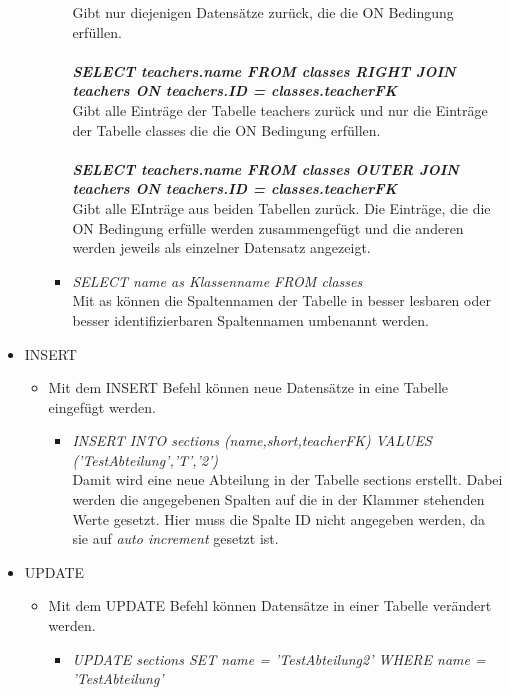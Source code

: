\begin{itemize}
\begin{itemize}
\begin{itemize}
		    			Gibt nur diejenigen Datensätze zurück, die die ON Bedingung erfüllen.\\\\
		    		\textbf{\textit{SELECT teachers.name FROM classes RIGHT JOIN teachers ON teachers.ID = classes.teacherFK}}\\
		    			Gibt alle Einträge der Tabelle teachers zurück und nur die Einträge der Tabelle classes die die ON Bedingung erfüllen.\\\\
		    		\textbf{\textit{SELECT teachers.name FROM classes OUTER JOIN teachers ON teachers.ID = classes.teacherFK}}\\
		    			Gibt alle EInträge aus beiden Tabellen zurück. Die Einträge, die die ON Bedingung erfülle werden zusammengefügt und die anderen werden jeweils als einzelner Datensatz angezeigt.\\
		    	\item \textit{SELECT name as Klassenname FROM classes}\\
		    		Mit as können die Spaltennamen der Tabelle in besser lesbaren oder besser identifizierbaren Spaltennamen umbenannt werden.
	    	\end{itemize}
    	\end{itemize}
    \item INSERT
	    \begin{itemize}
		   	\item Mit dem INSERT Befehl können neue Datensätze in eine Tabelle eingefügt werden.
		   	\begin{itemize}
			   	\item \textit{INSERT INTO sections (name,short,teacherFK) VALUES ('TestAbteilung','T','2')}\\
			   		Damit wird eine neue Abteilung in der Tabelle sections erstellt. Dabei werden die angegebenen Spalten auf die in der Klammer stehenden Werte gesetzt. Hier muss die Spalte ID nicht angegeben werden, da sie auf \textit{auto increment} gesetzt ist.
		   	\end{itemize}
	    \end{itemize}
	\item UPDATE
		\begin{itemize}
			\item Mit dem UPDATE Befehl können Datensätze in einer Tabelle verändert werden.
			\begin{itemize}
				\item \textit{UPDATE sections SET name = 'TestAbteilung2' WHERE name = 'TestAbteilung'}\\

\end{itemize}
\end{itemize}
\end{itemize}
